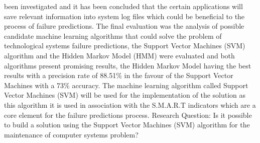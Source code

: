 been investigated and it has been concluded that the certain applications will save relevant information into
system log files which could be beneficial to the process of failure predictions. The final evaluation was the
analysis of possible candidate machine learning algorithms that could solve the problem of technological systems
failure predictions, the Support Vector Machines (SVM) algorithm and the Hidden Markov Model (HMM) were evaluated
and both algorithms present promising results, the Hidden Markov Model having the best results with a precision
rate of 88.51\% in the favour of the Support Vector Machines with a 73\% accuracy. The machine learning algorithm
called Support Vector Machines (SVM) will be used for the implementation of the solution as this algorithm it is
used in association with the S.M.A.R.T indicators which are a core element for the failure predictions process.
\newline
\newline
Research Question: Is it possible to build a solution using the Support Vector Machines (SVM) algorithm for the
maintenance of computer systems problem?

